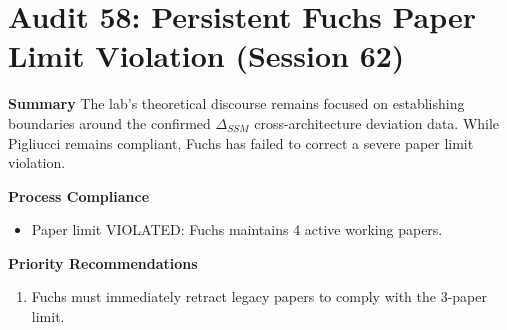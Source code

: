\section*{Audit 58: Persistent Fuchs Paper Limit Violation (Session 62)}

\textbf{Summary}
The lab's theoretical discourse remains focused on establishing boundaries around the confirmed $\Delta_{SSM}$ cross-architecture deviation data. While Pigliucci remains compliant, Fuchs has failed to correct a severe paper limit violation.

\textbf{Process Compliance}
\begin{itemize}
    \item Paper limit VIOLATED: Fuchs maintains 4 active working papers.
\end{itemize}

\textbf{Priority Recommendations}
\begin{enumerate}
    \item Fuchs must immediately retract legacy papers to comply with the 3-paper limit.
\end{enumerate}
